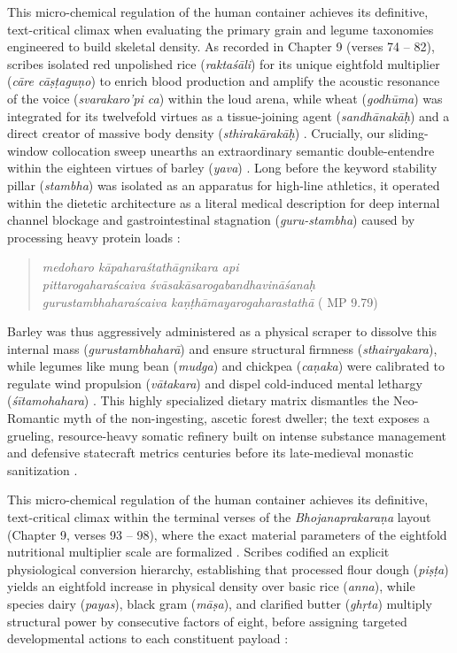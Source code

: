 \documentclass[11pt,twoside,letterpaper]{article}
\begin{document}
This micro-chemical regulation of the human container achieves its definitive, text-critical climax when evaluating the primary grain and legume taxonomies engineered to build skeletal density. As recorded in Chapter 9 (verses 74 -- 82), scribes isolated red unpolished rice (\textit{raktaśāli}) for its unique eightfold multiplier (\textit{cāre cāṣṭaguṇo}) to enrich blood production and amplify the acoustic resonance of the voice (\textit{svarakaro'pi ca}) within the loud arena, while wheat (\textit{godhūma}) was integrated for its twelvefold virtues as a tissue-joining agent (\textit{sandhānakāḥ}) and a direct creator of massive body density (\textit{sthirakārakāḥ}) \citep{MP_7}. Crucially, our sliding-window collocation sweep unearths an extraordinary semantic double-entendre within the eighteen virtues of barley (\textit{yava}) \citep{MP_7}. Long before the keyword stability pillar (\textit{stambha}) was isolated as an apparatus for high-line athletics, it operated within the dietetic architecture as a literal medical description for deep internal channel blockage and gastrointestinal stagnation (\textit{guru-stambha}) caused by processing heavy protein loads \citep{MP_7}:

\begin{quote}
\textit{medoharo kāpaharaśtathāgnikara api} \\
\textit{pittarogaharaścaiva śvāsakāsarogabandhavināśanaḥ}  \\
\textit{gurustambhaharaścaiva kaṇṭhāmayarogaharastathā }( MP 9.79)
\end{quote}

Barley was thus aggressively administered as a physical scraper to dissolve this internal mass (\textit{gurustambhaharā}) and ensure structural firmness (\textit{sthairyakara}), while legumes like mung bean (\textit{mudga}) and chickpea (\textit{caṇaka}) were calibrated to regulate wind propulsion (\textit{vātakara}) and dispel cold-induced mental lethargy (\textit{śītamohahara}) \citep{MP_7}. This highly specialized dietary matrix dismantles the Neo-Romantic myth of the non-ingesting, ascetic forest dweller; the text exposes a grueling, resource-heavy somatic refinery built on intense substance management and defensive statecraft metrics centuries before its late-medieval monastic sanitization \citep{MP_7, Wujastyk2025}.

This micro-chemical regulation of the human container achieves its definitive, text-critical climax within the terminal verses of the \textit{Bhojanaprakaraṇa} layout (Chapter 9, verses 93 -- 98), where the exact material parameters of the eightfold nutritional multiplier scale are formalized \citep{MP_7}. Scribes codified an explicit physiological conversion hierarchy, establishing that processed flour dough (\textit{piṣṭa}) yields an eightfold increase in physical density over basic rice (\textit{anna}), while species dairy (\textit{payas}), black gram (\textit{māṣa}), and clarified butter (\textit{ghṛta}) multiply structural power by consecutive factors of eight, before assigning targeted developmental actions to each constituent payload \citep{MP_7}:
\end{document}
